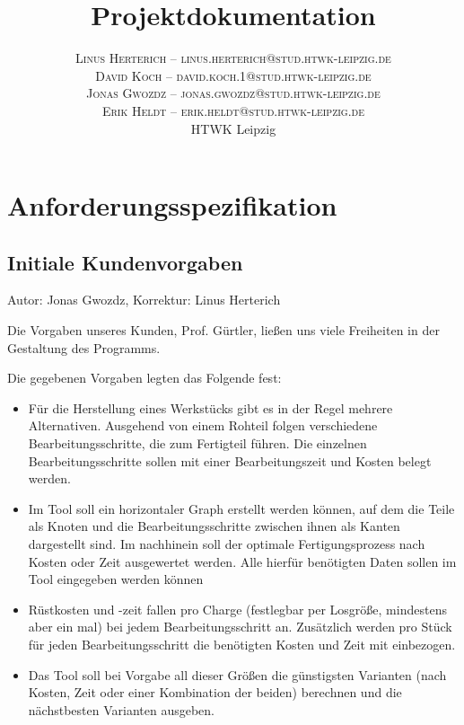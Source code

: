 \documentclass[twoside]{report}
\title{\vspace{-5mm}%
	\fontsize{24pt}{10pt}\selectfont
	\textbf{Projektdokumentation}
	}
\author{%
	\large
	\textsc{Linus Herterich -- linus.herterich@stud.htwk-leipzig.de} \\[2mm]
	\textsc{David Koch -- david.koch.1@stud.htwk-leipzig.de} \\[2mm]
	\textsc{Jonas Gwozdz -- jonas.gwozdz@stud.htwk-leipzig.de} \\[2mm]
	\textsc{Erik Heldt -- erik.heldt@stud.htwk-leipzig.de} \\[2mm]
	\normalsize	HTWK Leipzig 
	}
\date{}
\begin{document}

\maketitle
\thispagestyle{fancy}

\tableofcontents


\section{Anforderungsspezifikation}

\subsection{Initiale Kundenvorgaben}
{\small Autor: Jonas Gwozdz, Korrektur: Linus Herterich}

\vspace{\baselineskip}
\noindent Die Vorgaben unseres Kunden, Prof. Gürtler, ließen uns viele Freiheiten in der Gestaltung des Programms. \par

\noindent Die gegebenen Vorgaben legten das Folgende fest: \par
\begin{itemize}
  \item Für die Herstellung eines Werkstücks gibt es in der Regel mehrere Alternativen.
  Ausgehend von einem Rohteil folgen verschiedene   Bearbeitungsschritte, die zum Fertigteil führen. 
  Die einzelnen Bearbeitungsschritte sollen mit einer Bearbeitungszeit und Kosten belegt werden. \par

  \item Im Tool soll ein horizontaler Graph erstellt werden können, auf dem die Teile als Knoten und 
  die Bearbeitungsschritte zwischen ihnen als Kanten dargestellt sind. Im nachhinein soll der optimale 
  Fertigungsprozess nach Kosten oder Zeit ausgewertet werden. Alle hierfür benötigten Daten sollen im Tool eingegeben werden können\par

  \item Rüstkosten und -zeit fallen pro Charge (festlegbar per Losgröße, mindestens aber ein mal) bei jedem Bearbeitungsschritt an. 
  Zusätzlich werden pro Stück für jeden Bearbeitungsschritt die benötigten Kosten und Zeit mit einbezogen. \par

  \item Das Tool soll bei Vorgabe all dieser Größen die günstigsten Varianten (nach Kosten, Zeit oder einer Kombination der beiden) 
  berechnen und die nächstbesten Varianten ausgeben.
\end{itemize}
\end{document}
